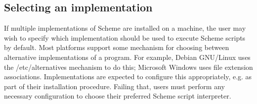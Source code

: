 \subsection{Selecting an implementation}
If multiple implementations of Scheme are installed on a machine, the
user may wish to specify which implementation should be used to 
execute Scheme scripts by default.  Most platforms support some 
mechanism for choosing between alternative implementations of a 
program.  For example, Debian GNU/Linux uses the {\cf /etc/alternatives} 
mechanism to do this; Microsoft Windows uses file extension 
associations.  Implementations are expected to configure this 
appropriately, e.g. as part of their installation procedure.
Failing that, users must perform any necessary configuration to 
choose their preferred Scheme script interpreter.

